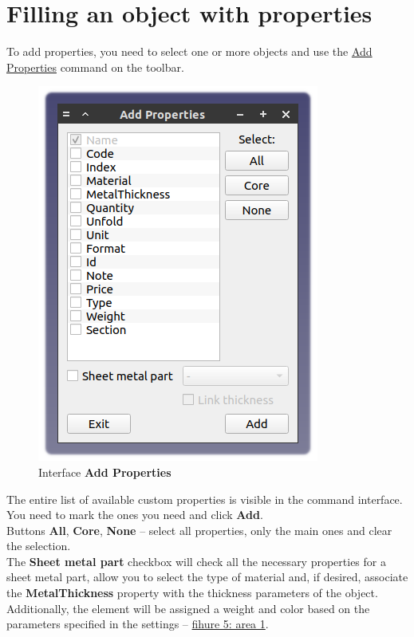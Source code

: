 \documentclass[a4paper,12pt]{article}
\begin{document}
\section{Filling an object with properties}

To add properties, you need to select one or more objects and use the \hyperref[sec:5]{Add Properties} command on the toolbar.

\begin{figure}[htp]
	\centering
	\includegraphics[scale=1]{img/properties_add.png}
	\caption{Interface \textbf{Add Properties}}
	\label{sec:properties_add}
\end{figure}

The entire list of available custom properties is visible in the command interface. You need to mark the ones you need and click \textbf{Add}.\\

Buttons \textbf{All}, \textbf{Core}, \textbf{None} -- select all properties, only the main ones and clear the selection.\\

The \textbf{Sheet metal part} checkbox will check all the necessary properties for a sheet metal part, allow you to select the type of material and, if desired, associate the \textbf{MetalThickness} property with the thickness parameters of the object. Additionally, the element will be assigned a weight and color based on the parameters specified in the settings -- \hyperref[sec:pref_sm]{fihure 5: area 1}.\\
\end{document}
